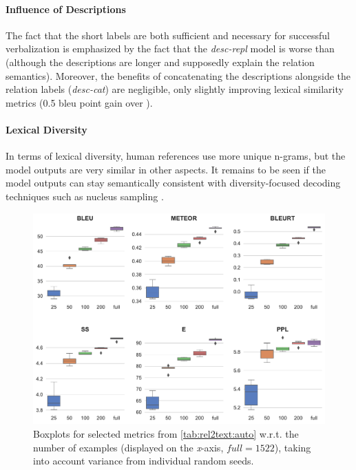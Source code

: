 \paragraph{Influence of Descriptions} The fact that the short labels are both sufficient and necessary for successful verbalization is emphasized by the fact that the \textit{desc-repl} model is worse than \BARTr{} (although the descriptions are longer and supposedly explain the relation semantics). Moreover, the benefits of concatenating the descriptions alongside the relation labels (\textit{desc-cat}) are negligible, only slightly improving lexical similarity metrics (0.5 \acs{bleu} point gain over \BARTr{}).

\paragraph{Lexical Diversity} In terms of lexical diversity, human references use more unique n-grams, but the model outputs are very similar in other aspects. It remains to be seen if the model outputs can stay semantically consistent with diversity-focused decoding techniques such as nucleus sampling \cite{holtzman2019curious}.

\begin{figure}[t]
    \centering
    \includegraphics[width=\textwidth]{img/rel2text-fewshot.pdf}
    \caption[Selected automatic metrics on few-shot generation.]{Boxplots for selected metrics from \autoref{tab:rel2text:auto} w.r.t. the number of examples (displayed on the \textit{x}-axis, $\textit{full} = 1522$), taking into account variance from individual random seeds.}\label{fig:rel2text:fewshot}
\end{figure}


